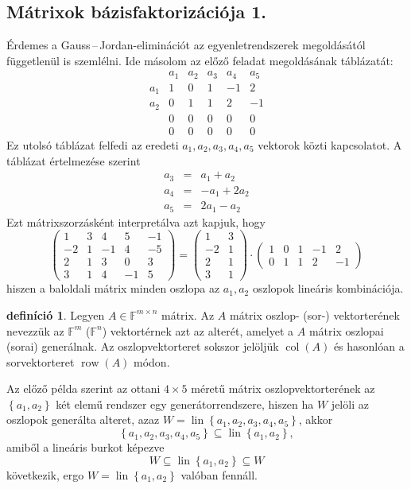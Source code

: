 \documentclass[a4paper, showtrims]{memoir}
\theoremstyle{plain}
\theoremstyle{remark}
\theoremstyle{definition}
\newtheorem{definition}[proposition]{definíció}
\DeclareMathOperator{\lin}{lin}
\DeclareMathOperator{\col}{col}
\DeclareMathOperator{\row}{row}
\begin{document}
\subsection{Mátrixok bázisfaktorizációja 1.}
Érdemes a Gauss\,--\,Jordan-eliminációt  az egyenletrendszerek megoldásától függetlenül is szemlélni.
Ide másolom az előző feladat megoldásának táblázatát:
\[
	\begin{array}{r|rrrrr}
		    & a_1 & a_2 & a_3 & a_4 & a_5 \\
		\hline
		a_1 & 1   & 0   & 1   & -1  & 2   \\
		a_2 & 0   & 1   & 1   & 2   & -1  \\
		    & 0   & 0   & 0   & 0   & 0   \\
		    & 0   & 0   & 0   & 0   & 0
	\end{array}
\]
Ez utolsó táblázat felfedi az eredeti $a_1,a_2,a_3,a_4,a_5$ vektorok közti kapcsolatot.
A táblázat értelmezése szerint
\begin{eqnarray*}
	a_3&=& a_1+a_2\\
	a_4&=& -a_1+2a_2\\
	a_5&=& 2a_1-a_2
\end{eqnarray*}
Ezt mátrixszorzásként interpretálva azt kapjuk, hogy
\[
	\begin{pmatrix}
		1  & 3 & 4  & 5  & -1 \\
	   -2  & 1 & -1 & 4  & -5 \\
		2  & 1 & 3  & 0  & 3  \\
		3  & 1 & 4  & -1 & 5
	\end{pmatrix}
	=
	\begin{pmatrix}
		1  & 3 \\
		-2 & 1 \\
		2  & 1 \\
		3  & 1
	\end{pmatrix}
	\cdot
	\begin{pmatrix}
		1 & 0 & 1 & -1 & 2  \\
		0 & 1 & 1 & 2  & -1
	\end{pmatrix}
    \tag{\dag}\label{bazisfakt}
\]
hiszen a baloldali mátrix minden oszlopa az $a_1,a_2$ oszlopok lineáris kombinációja.

\begin{definition}
	Legyen $A\in\mathbb{F}^{m\times n}$ mátrix.
    Az $A$ mátrix oszlop- (sor-) vektorterének nevezzük az $\mathbb{F}^m$ ($\mathbb{F}^n$) vektortérnek azt az alterét, amelyet a $A$ mátrix oszlopai (sorai) generálnak.
    Az oszlopvektorteret sokszor jelöljük $\col(A)$ és hasonlóan a sorvektorteret $\row(A)$ módon.
\end{definition}
Az előző példa szerint az ottani $4\times 5$ méretű mátrix oszlopvektorterének az $\left\{ a_1,a_2 \right\}$ két elemű rendszer
egy generátorrendszere, hiszen ha $W$ jelöli az oszlopok generálta alteret, azaz
\(W=\lin\left\{ a_1,a_2,a_3,a_4,a_5 \right\}\), akkor 
\[
    \left\{ a_1,a_2,a_3,a_4,a_5 \right\}\subseteq
    \lin{\left\{ a_1,a_2\right\}},
\]
amiből a lineáris burkot képezve
\[
    W
    \subseteq
    \lin{\left\{ a_1,a_2\right\}}
    \subseteq
    W
\]
következik, ergo $W=\lin\left\{ a_1,a_2 \right\}$ valóban fennáll.
\end{document}
